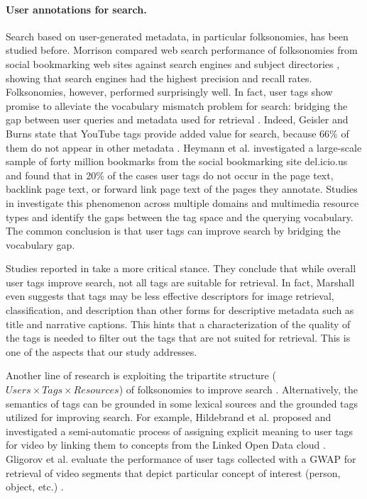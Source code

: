 \paragraph{User annotations for search.} Search based on user-generated metadata, in particular folksonomies, has been studied before. Morrison compared web search performance of folksonomies from social bookmarking web sites against search engines and subject directories \cite{morison}, showing that search engines had the highest precision and recall rates. Folksonomies, however, performed surprisingly well. In fact, user tags show promise to alleviate the vocabulary mismatch problem for search: bridging the gap between user queries and metadata used for retrieval \cite{vocprob}. Indeed, Geisler and Burns state that YouTube tags provide added value for search, because 66\% of them do not appear in  other metadata \cite{youtube}. Heymann et al. investigated a large-scale sample of forty million bookmarks from the social bookmarking site del.icio.us and found that in 20\% of the cases user tags do not occur in the page text, backlink page text, or forward link page text of the pages they annotate. Studies in \cite{Bischoff:2010:BGT:1833903.1834001,Halvey:2007:AOV:1286240.1286301,journals/jasis/Rorissa10,Yanbe:2007:SBE:1255175.1255198} investigate this phenomenon across multiple domains and multimedia resource types and identify the gaps between the tag space and the querying vocabulary. The common conclusion is that user tags can improve search by bridging the vocabulary gap. 

Studies reported in \cite{Bischoff:2008:TUS:1458082.1458112,Sun:2010:QTR:1873951.1874029,Marshall:2009:NBN:1555400.1555438} take a more critical stance. They conclude that while overall user tags improve search, not all tags are suitable for retrieval. In fact, Marshall \cite{Marshall:2009:NBN:1555400.1555438} even suggests that tags  may be less effective descriptors for image retrieval, classification, and description than other forms for descriptive metadata such as title and narrative captions. This hints that a characterization of the quality of the tags is needed to filter out the tags that are not suited for retrieval. This is one of the aspects that our study addresses. 

Another line of research is exploiting the tripartite structure ($Users \times Tags \times Resources$) of folksonomies to improve search \cite{Hotho:2006:IRF:2094613.2094652,Bao:2007:OWS:1242572.1242640}. Alternatively, the semantics of tags can be grounded in some lexical sources and the grounded tags utilized for improving search. For example, Hildebrand et al. proposed and investigated a semi-automatic process of assigning explicit meaning to user tags for video by linking them to concepts from the Linked Open Data cloud \cite{michiel}. Gligorov et al. evaluate the performance of user tags collected with a GWAP for retrieval of video segments that depict particular concept of interest (person, object, etc.) \cite{ecir}.

